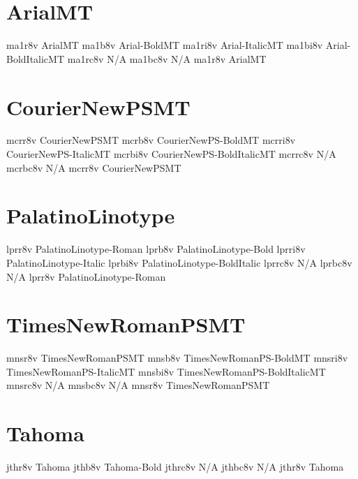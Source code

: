 \documentclass[sample]{vnsample}
\begin{document}
\section{ArialMT}
  {ma1r8v}  {ArialMT}
  {ma1b8v}  {Arial-BoldMT}
 {ma1ri8v} {Arial-ItalicMT}
 {ma1bi8v} {Arial-BoldItalicMT}
 {ma1rc8v} {N/A}
 {ma1bc8v} {N/A}
  {ma1r8v}  {ArialMT}

\section{CourierNewPSMT}
  {mcrr8v}  {CourierNewPSMT}
  {mcrb8v}  {CourierNewPS-BoldMT}
 {mcrri8v} {CourierNewPS-ItalicMT}
 {mcrbi8v} {CourierNewPS-BoldItalicMT}
 {mcrrc8v} {N/A}
 {mcrbc8v} {N/A}
  {mcrr8v}  {CourierNewPSMT}

\section{PalatinoLinotype}
  {lprr8v}  {PalatinoLinotype-Roman}
  {lprb8v}  {PalatinoLinotype-Bold}
 {lprri8v} {PalatinoLinotype-Italic}
 {lprbi8v} {PalatinoLinotype-BoldItalic}
 {lprrc8v} {N/A}
 {lprbc8v} {N/A}
  {lprr8v}  {PalatinoLinotype-Roman}

\section{TimesNewRomanPSMT}
  {mnsr8v}  {TimesNewRomanPSMT}
  {mnsb8v}  {TimesNewRomanPS-BoldMT}
 {mnsri8v} {TimesNewRomanPS-ItalicMT}
 {mnsbi8v} {TimesNewRomanPS-BoldItalicMT}
 {mnsrc8v} {N/A}
 {mnsbc8v} {N/A}
  {mnsr8v}  {TimesNewRomanPSMT}

\section{Tahoma}
  {jthr8v}  {Tahoma}
  {jthb8v}  {Tahoma-Bold}
 {jthrc8v} {N/A}
 {jthbc8v} {N/A}
  {jthr8v}  {Tahoma}
\end{document}
